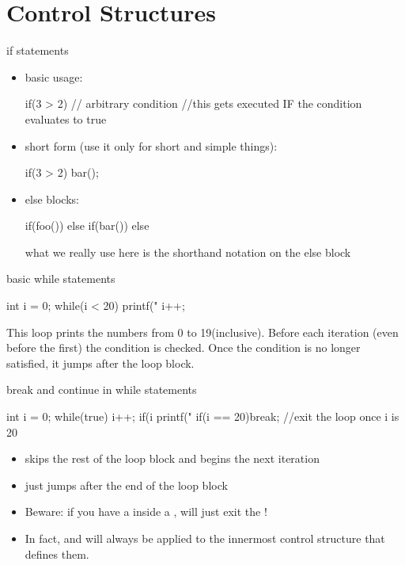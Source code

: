 \documentclass[10pt,graphics,aspectratio=169,table]{beamer}
\begin{document}
\section{Control Structures}
\begin{frame}[fragile]{if statements}
    \begin{itemize}
    \item basic usage:
        \begin{codeblock}
if(3 > 2){  // arbitrary condition
    //this gets executed IF the condition evaluates to true
}
        \end{codeblock}
    \item short form (use it only for short and simple things):
        \begin{codeblock}
if(3 > 2) bar();
        \end{codeblock}

    \item else blocks:
        \begin{codeblock}
if(foo()){
}
else if(bar()){
}
else{
}
        \end{codeblock}

        what we really use here is the shorthand notation on the else block

    \end{itemize}
\end{frame}

\begin{frame}[fragile]{basic while statements}
    \begin{codeblock}
int i = 0;
while(i < 20){
    printf("%
    i++;
}
    \end{codeblock}

    This loop prints the numbers from 0 to 19(inclusive).
    Before each iteration (even before the first) the condition is checked.
    Once the condition is no longer satisfied, it jumps after the loop block.
\end{frame}
\begin{frame}[fragile]{break and continue in while statements}
    \begin{codeblock}
int i = 0;
while(true){
    i++;
    if(i %
    printf("%
    if(i == 20)break; //exit the loop once i is 20
}
    \end{codeblock}
    \begin{itemize}
        \item
             skips the rest of the loop block and begins
            the next iteration
        \item {} just jumps after the end of the loop block
        \item
            Beware: if you have a  inside a ,
             will just exit the !
        \item
            In fact,  and  will always be applied to
            the innermost control structure that defines them.
    \end{itemize}
\end{frame}
\end{document}
